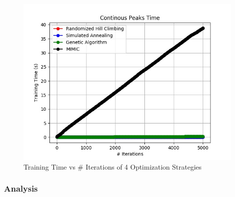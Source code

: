 \documentclass[h]{article}
\begin{document}
\begin{figure}[H]
      \includegraphics[width=1\textwidth,keepaspectratio]{continous_peaks_time.jpg} 
      \caption*{Training Time vs # Iterations of 4 Optimization Strategies} 
   \endminipage\hfill
\end{figure}

\subsubsection*{Analysis}
\end{document}

